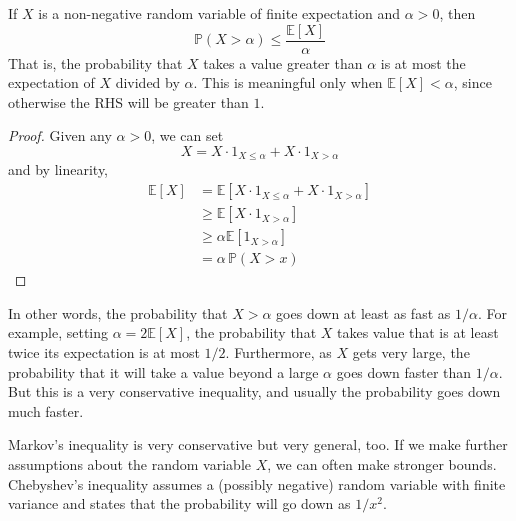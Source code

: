   \begin{theorem}
    If $X$ is a non-negative random variable of finite expectation and $\alpha > 0$, then 
    \begin{equation}
      \mathbb{P}(X > \alpha) \leq \frac{\mathbb{E}[X]}{\alpha}
    \end{equation}
    That is, the probability that $X$ takes a value greater than $\alpha$ is at most the expectation of $X$ divided by $\alpha$. This is meaningful only when $\mathbb{E}[X] < \alpha$, since otherwise the RHS will be greater than $1$.  
  \end{theorem}
  \begin{proof}
    Given any $\alpha > 0$, we can set 
    \begin{equation}
      X = X \cdot 1_{X \leq \alpha} + X \cdot 1_{X > \alpha}
    \end{equation}
    and by linearity, 
    \begin{align*}
      \mathbb{E}[X] & = \mathbb{E}[X \cdot 1_{X \leq \alpha} + X \cdot 1_{X > \alpha}] \\
      & \geq \mathbb{E}[ X \cdot 1_{X > \alpha}] \\
      & \geq \alpha \mathbb{E}[1_{X > \alpha}] \\
      & = \alpha \, \mathbb{P}(X > x) 
    \end{align*}
  \end{proof}

  In other words, the probability that $X > \alpha$ goes down at least as fast as $1/\alpha$. For example, setting $\alpha = 2 \mathbb{E}[X]$, the probability that $X$ takes value that is at least twice its expectation is at most $1/2$. Furthermore, as $X$ gets very large, the probability that it will take a value beyond a large $\alpha$ goes down faster than $1/\alpha$. But this is a very conservative inequality, and usually the probability goes down much faster. 

  Markov's inequality is very conservative but very general, too. If we make further assumptions about the random variable $X$, we can often make stronger bounds. Chebyshev's inequality assumes a (possibly negative) random variable with finite variance and states that the probability will go down as $1/x^2$. 

